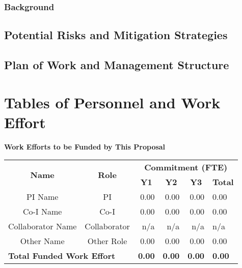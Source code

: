 \documentclass[oneside,12pt]{article}
\begin{document}
    \subsubsection{Background}

    \subsection{Potential Risks and Mitigation Strategies}

    \subsection{Plan of Work and Management Structure}

    \clearpage


    \section{Tables of Personnel and Work Effort}

    \bigskip
    \renewcommand{\arraystretch}{1.2}

    \begin{center}
        \textbf{Work Efforts to be Funded by This Proposal}
        \vspace{-1em}
    \end{center}

    \begin{table}[h]
        \centering
        \begin{tabular}{|c|c|r|r|r|l|}
            \hline
            \multirow{2}{*}{\textbf{Name}} & \multirow{2}{*}{\textbf{Role}} & \multicolumn{4}{c|}{\textbf{Commitment (FTE)}} \\
            \cline{3-6}
            & & \multicolumn{1}{c|}{\textbf{Y1}} & \multicolumn{1}{c|}{\textbf{Y2}} & \multicolumn{1}{c|}{\textbf{Y3}} & \multicolumn{1}{c|}{\textbf{Total}} \\
            \hline
            PI Name           & PI           & 0.00 & 0.00 & 0.00 & 0.00 \\
            Co-I Name         & Co-I         & 0.00 & 0.00 & 0.00 & 0.00 \\
            Collaborator Name & Collaborator & n/a  & n/a  & n/a  & n/a  \\
            Other Name        & Other Role   & 0.00 & 0.00 & 0.00 & 0.00 \\
            \hline
            \multicolumn{2}{|l|}{\textbf{Total Funded Work Effort}} & \textbf{0.00} & \textbf{0.00} & \textbf{0.00} & \textbf{0.00} \\
            \hline
        \end{tabular}
    \end{table}
\end{document}
